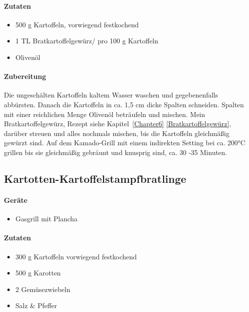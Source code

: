 \paragraph{Zutaten}

\begin{itemize}[noitemsep]
	\item 500 g Kartoffeln, vorwiegend festkochend
	\item 1 TL Bratkartoffelgewürz/ pro 100 g Kartoffeln
	\item Olivenöl
\end{itemize}

\paragraph{Zubereitung}

Die ungeschälten Kartoffeln kaltem Wasser waschen und gegebenenfalls abbürsten. Danach die Kartoffeln in ca. 1,5 cm dicke Spalten schneiden. Spalten mit einer reichlichen Menge Olivenöl beträufeln und mischen. Mein Bratkartoffelgewürz, Rezept siehe Kapitel~\ref{Chapter6} \vref{Bratkartoffelgewürz}, darüber streuen und alles nochmals mischen, bis die Kartoffeln gleichmäßig gewürzt sind. Auf dem Kamado-Grill mit einem indirekten Setting bei ca. 200°C grillen bis sie gleichmäßig gebräunt und knusprig sind, ca. 30 -35 Minuten.

\subsection{Kartotten-Kartoffelstampfbratlinge}

\paragraph{Geräte}

\begin{itemize}[noitemsep]
	\item 
	Gasgrill mit Plancha
\end{itemize}

\paragraph{Zutaten}

\begin{itemize}[noitemsep]
	\item 300 g Kartoffeln vorwiegend festkochend
	\item 500 g Karotten
	\item 2 Gemüsezwiebeln
	\item Salz \& Pfeffer 
\end{itemize}

